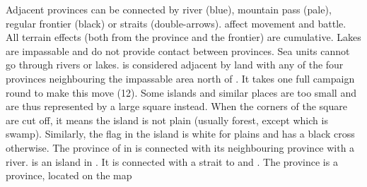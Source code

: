 \aparag[Frontiers] Adjacent provinces can be connected by river (blue),
mountain pass (pale), regular frontier (black) or straits (double-arrows).
 affect movement and battle. All
terrain effects (both from the province and the frontier) are cumulative.
\aparag[Lakes] Lakes are impassable and do not provide contact between
provinces.
\bparag Sea units cannot go through rivers or lakes.
\label{chBasics:Secret Passage:Bering}
\granderegionKamchatka is considered adjacent by land with any of the four
provinces neighbouring the impassable area north of \seazoneOkhotsk.
It takes one full campaign round to make this move (12\MP).
 Some islands and similar places are too small and are
thus represented by a large square instead.
\bparag When the corners of the square are cut off, it means the island is not
plain (usually forest, except  which is
swamp). Similarly, the flag in the island is white for plains and has a black
cross otherwise.
\bparag The province of  in \granderegionAcadie is
connected with its neighbouring province with a river.
\bparag\label{chBasics:Provinces:Ormus} \null\provinceOrmus is an
island in \seazonePersique. It is connected with a strait to \provinceBam and
. The province is a \ROTW province, located on the \ROTW map
